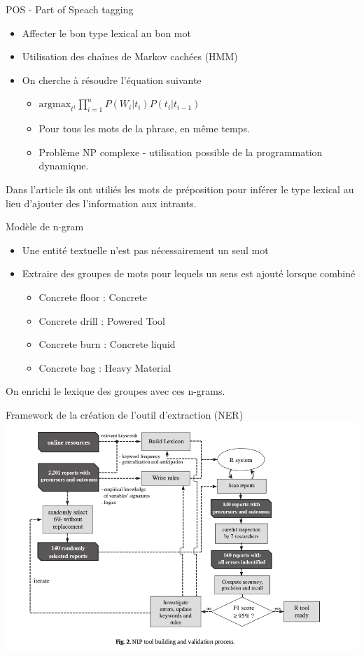 \begin{frame}	
	POS - Part of Speach tagging
	\begin{itemize}
		\item Affecter le bon type lexical au bon mot
		\item Utilisation des chaînes de Markov cachées (HMM)
		\item On cherche à résoudre l'équation suivante
		\begin{itemize}
			\item $\textrm{argmax}_{t^1}  \prod_{i=1}^{n}  P(W_i|t_i) P(t_i|t_{i-1}) $
			\item Pour tous les mots de la phrase, en même temps.
			\item Problème NP complexe - utilisation possible de la programmation dynamique.
		\end{itemize}
	\end{itemize}
	Dans l'article ils ont utiliés les mots de préposition pour inférer le type lexical au lieu d'ajouter des l'information aux intrants.
\end{frame}

\begin{frame}	
	Modèle de n-gram
	\begin{itemize}
		\item Une entité textuelle n'est pas nécessairement un seul mot
		\item Extraire des groupes de mots pour lequels un sens est ajouté lorsque combiné
		\begin{itemize}
			\item Concrete floor : Concrete
			\item Concrete drill : Powered Tool
			\item Concrete burn : Concrete liquid 
			\item Concrete bag : Heavy Material
		\end{itemize}	
	\end{itemize}
	On enrichi le lexique des groupes avec ces n-grams.
\end{frame}

\begin{frame}	
	Framework de la création de l'outil d'extraction (NER)
	\includegraphics[width=\paperwidth]{rtool_training_framework}
\end{frame}



